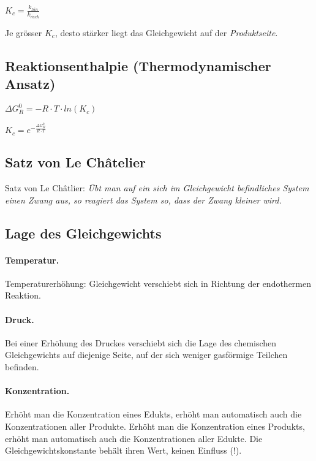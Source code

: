 \begin{definition}[Gleichgewichtskonstante]
	{\large$K_c=\frac{k_{hin}}{k_{r\ddot{u}ck}}$}
	
	Je grösser $K_c$, desto stärker liegt das Gleichgewicht auf der \textit{Produktseite}.
\end{definition}

\subsection{Reaktionsenthalpie (Thermodynamischer Ansatz)}

{\large
$\Delta G^0_R = -R \cdot T \cdot ln(K_c)$

$K_c = e^{-\frac{\Delta G^0_R}{R \cdot T}}$
}
\subsection{Satz von Le Châtelier}

Satz von Le Châtlier:
\textit{Übt man auf ein sich im Gleichgewicht befindliches System einen Zwang aus, so reagiert das System so, dass der Zwang kleiner wird.}

\subsection{Lage des Gleichgewichts}

\paragraph{Temperatur.} Temperaturerhöhung: Gleichgewicht verschiebt sich in Richtung der endothermen Reaktion.

\paragraph{Druck.} Bei einer Erhöhung des Druckes verschiebt sich die Lage des chemischen Gleichgewichts auf diejenige Seite, auf der sich weniger gasförmige Teilchen befinden.

\paragraph{Konzentration.} Erhöht man die Konzentration eines Edukts, erhöht man automatisch auch die Konzentrationen aller Produkte. Erhöht man die Konzentration eines Produkts, erhöht man automatisch auch die Konzentrationen aller Edukte. Die Gleichgewichtskonstante behält ihren Wert, keinen Einfluss (!).

